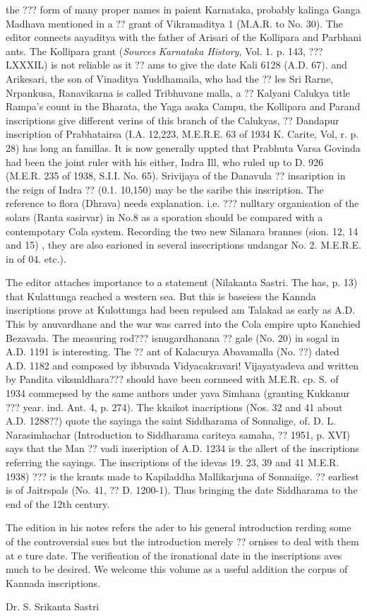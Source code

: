 \documentclass{book}
\begin{document}
the  ??? form of many proper names in paient Karnataka, probably
kalinga Ganga Madhava mentioned in a ?? grant of Vikramaditya 1
(M.A.R. to No. 30). The editor connects aayaditya with the father of
Arisari of the Kollipara and Parbhani ants. The Kollipara grant
(\textit{Sources Karnataka History,} Vol. 1. p. 143, ??? LXXXIL) is
not reliable as it ?? ams to give the date Kali 6128 (A.D. 67). and
Arikesari, the son of Vinaditya Yuddhamaila, who had the ?? les Sri
Rarne, Nrpankusa, Ranavikarna is called Tribhuvane malla, a ?? Kalyani
Calukya title Rampa's count in the Bharata, the Yaga asaka Campu, the
Kollipara and Parand inscriptions give different verins of this branch
of the Calukyas, ?? Dandapur inscription of Prabhatairsa (I.A. 12,223,
M.E.R.E. 63 of 1934 K. Carite, Vol, r. p. 28) has long an famillas. It
is now generally uppted that Prabhuta Varsa Govinda had been the joint
ruler with his either, Indra Ill, who ruled up to D. 926 (M.E.R. 235
of 1938, S.I.I. No. 65). Srivijaya of the Danavula ?? insaription in
the reign of Indra ?? (0.1. 10,150) may be the saribe this
inscription. The reference to flora (Dhrava) needs
explanation. i.e. ??? nulltary organisation of the solars (Ranta
sasirvar) in No.8 as a sporation should be compared with a
contempotary Cola system. Recording the two new Silanara brannes
(sion. 12, 14 and 15) , they are also earioned in several
insecriptions undangar No. 2. M.E.R.E. in of 04. etc.).

The editor attaches importance to a statement (Nilakanta Sastri. The
has, p. 13) that Kulattunga reached a western sea. But this is
baseiess the Kannda inscriptions prove at Kulottunga had been repulsed
am Talakad as early as A.D. This by anuvardhane and the war was carred
into the Cola empire upto Kanchied Bezavada. The measuring rod???
isnugardhanana ?? gale (No. 20) in sogal in A.D. 1191 is
interesting. The ?? ant of Kalacurya Abavamalla (No. ??) dated
A.D. 1182 and composed by ibbuvada Vidyacakravari! Vijayatyadeva and
written by Pandita viksmldhara??? should have been cornneed with
M.E.R. cp. S. of 1934 commepsed by the same anthors under yava Simhana
(granting Kukkanur ??? year. ind. Ant. 4, p. 274). The kkaikot
inacriptions (Nos. 32 and 41 about A.D. 1288??) quote the sayinga the
saint Siddharama of Sonnalige, of. D. L. Narasimhachar (Introduction
to Siddharama cariteya samaha, ?? 1951, p. XVI) says that the
Man ?? vadi inseription of A.D. 1234 is the allert of the inscriptions
referring the sayings. The inscriptions of the idevas 19. 23, 39 and
41 M.E.R. 1938) ??? is the krants made to Kapiladdha Mallikarjuna of
Sonnaiige. ?? earliest is of Jaitrspals (No. 41, ?? D. 1200-1). Thus
bringing the date Siddharama to the end of the 12th century.

The edition in his notes refers the ader to his general introduction
rerding some of the controversial sues but the introduction merely  ??
ornises to deal with them at e ture date. The verifieation of the
ironational date in the inscriptions aves much to be desired. We
welcome this volume as a useful addition the corpus of Kannada
inscriptions.

\hfill Dr. S. Srikanta Sastri
\end{document}
